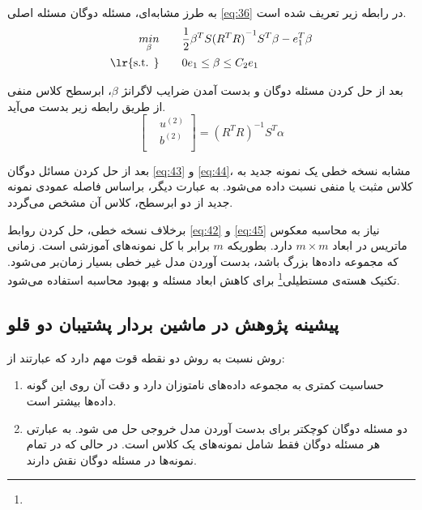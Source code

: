 به طرز مشابه‌ای، مسئله دوگان مسئله اصلی \ref{eq:36} در رابطه زیر تعریف شده است.
\begin{equation}
\begin{split}
\mathop{{ min}}\limits_{\beta} \qquad & \frac{1}{2}{{\beta }^{T}}S{{({{R}^{T}}R)}^{-1}}{{S}^{T}}\beta -e_{1}^{T}\beta  \\
\textrm{\lr{s.t. }} \qquad & 0{{e}_{1}}\le \beta \le {{C}_{2}}{{e}_{1}}
\end{split}
\label{eq:44}
\end{equation}

بعد از حل کردن مسئله دوگان و بدست آمدن ضرایب لاگرانژ $\beta$، ابرسطح کلاس منفی از طریق رابطه زیر بدست می‌آید.
\begin{equation}
\left[ \begin{aligned}
& {{u}^{(2)}} \\
& {{b}^{(2)}} \\
\end{aligned}\right]= {{({{R}^{T}}R)}^{-1}}{{S}^{T}}\alpha
\label{eq:45}
\end{equation}

بعد از حل کردن مسائل دوگان \ref{eq:43} و \ref{eq:44}، مشابه نسخه خطی یک نمونه جدید به کلاس مثبت یا منفی نسبت داده می‌شود. به عبارت دیگر، براساس فاصله عمودی نمونه جدید از دو ابرسطح، کلاس آن مشخص می‌گردد. 

برخلاف نسخه خطی، حل کردن روابط \ref{eq:42} و \ref{eq:45} نیاز به محاسبه معکوس ماتریس در ابعاد  $m  \times m$  دارد. بطوریکه  $m$ برابر با کل نمونه‌های آموزشی است. زمانی که مجموعه داده‌ها بزرگ باشد، بدست آوردن مدل غیر خطی بسیار زمان‌بر می‌شود. تکنیک هسته‌ی مستطیلی\footnote{} \cite{mang2001} برای کاهش ابعاد مسئله و بهبود محاسبه استفاده می‌شود.

\subsection{پیشینه پژوهش در ماشین بردار پشتیبان دو قلو}\label{sec:2:2:3}
روش  نسبت به روش  دو نقطه قوت مهم دارد که عبارتند از:
\begin{enumerate}
	\item 	حساسیت کمتری به مجموعه داده‌های نامتوزان دارد و دقت آن روی این گونه داده‌ها بیشتر است.
	\item دو مسئله دوگان کوچکتر برای بدست آوردن مدل خروجی حل می شود. به عبارتی هر مسئله دوگان فقط شامل نمونه‌های یک کلاس است. در حالی که در  تمام نمونه‌ها در مسئله دوگان نقش دارند.
\end{enumerate}

